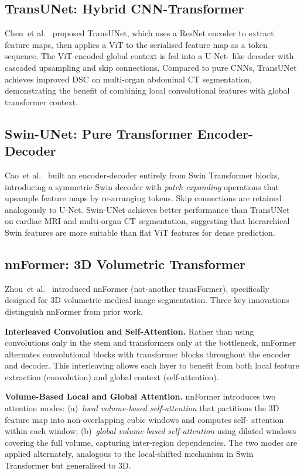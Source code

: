 \documentclass[preprint,12pt,authoryear]{elsarticle}
\begin{document}
\subsection{TransUNet: Hybrid CNN-Transformer}
\label{sec:transunet}

Chen~et al.~\citep{chen2021transunet} proposed TransUNet, which uses a ResNet
encoder to extract feature maps, then applies a ViT to the serialised feature
map as a token sequence. The ViT-encoded global context is fed into a U-Net-
like decoder with cascaded upsampling and skip connections. Compared to pure
CNNs, TransUNet achieves improved DSC on multi-organ abdominal CT segmentation,
demonstrating the benefit of combining local convolutional features with global
transformer context.

\subsection{Swin-UNet: Pure Transformer Encoder-Decoder}
\label{sec:swinunet}

Cao~et al.~\citep{cao2022swinunet} built an encoder-decoder entirely from Swin
Transformer blocks, introducing a symmetric Swin decoder with \emph{patch
expanding} operations that upsample feature maps by re-arranging tokens. Skip
connections are retained analogously to U-Net. Swin-UNet achieves better
performance than TransUNet on cardiac MRI and multi-organ CT segmentation,
suggesting that hierarchical Swin features are more suitable than flat ViT
features for dense prediction.

\subsection{nnFormer: 3D Volumetric Transformer}
\label{sec:nnformer}

Zhou~et al.~\citep{zhou2023nnformer} introduced nnFormer (not-another
transFormer), specifically designed for 3D volumetric medical image
segmentation. Three key innovations distinguish nnFormer from prior work.

\textbf{Interleaved Convolution and Self-Attention.} Rather than using
convolutions only in the stem and transformers only at the bottleneck, nnFormer
alternates convolutional blocks with transformer blocks throughout the encoder
and decoder. This interleaving allows each layer to benefit from both local
feature extraction (convolution) and global context (self-attention).

\textbf{Volume-Based Local and Global Attention.} nnFormer introduces two
attention modes: (a)~\emph{local volume-based self-attention} that partitions
the 3D feature map into non-overlapping cubic windows and computes self-
attention within each window; (b)~\emph{global volume-based self-attention}
using dilated windows covering the full volume, capturing inter-region
dependencies. The two modes are applied alternately, analogous to the
local-shifted mechanism in Swin Transformer but generalised to 3D.
\end{document}
